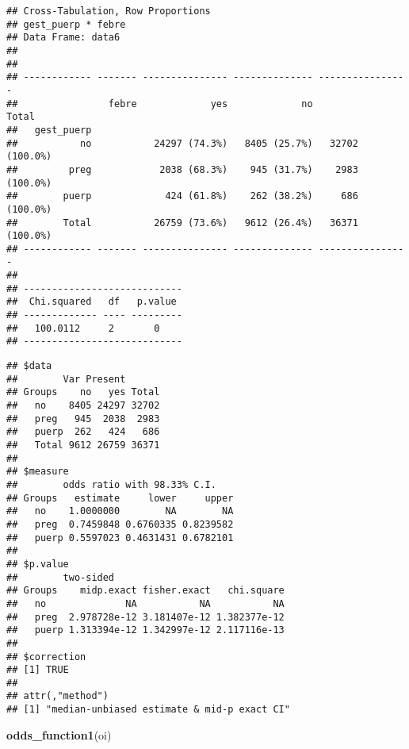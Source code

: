 \documentclass[
]{article}
\newenvironment{Shaded}{\begin{snugshade}}{\end{snugshade}}
\newcommand{\KeywordTok}[1]{\textcolor[rgb]{0.13,0.29,0.53}{\textbf{#1}}}
\newcommand{\NormalTok}[1]{#1}
\newcommand{\OperatorTok}[1]{\textcolor[rgb]{0.81,0.36,0.00}{\textbf{#1}}}
\newcommand{\StringTok}[1]{\textcolor[rgb]{0.31,0.60,0.02}{#1}}
\begin{document}
\begin{verbatim}
## Cross-Tabulation, Row Proportions  
## gest_puerp * febre  
## Data Frame: data6  
## 
## 
## ------------ ------- --------------- -------------- ----------------
##                febre             yes             no            Total
##   gest_puerp                                                        
##           no           24297 (74.3%)   8405 (25.7%)   32702 (100.0%)
##         preg            2038 (68.3%)    945 (31.7%)    2983 (100.0%)
##        puerp             424 (61.8%)    262 (38.2%)     686 (100.0%)
##        Total           26759 (73.6%)   9612 (26.4%)   36371 (100.0%)
## ------------ ------- --------------- -------------- ----------------
## 
## ----------------------------
##  Chi.squared   df   p.value 
## ------------- ---- ---------
##   100.0112     2       0    
## ----------------------------
\end{verbatim}

\begin{Shaded}
\end{Shaded}

\begin{verbatim}
## $data
##        Var Present
## Groups    no   yes Total
##   no    8405 24297 32702
##   preg   945  2038  2983
##   puerp  262   424   686
##   Total 9612 26759 36371
## 
## $measure
##        odds ratio with 98.33% C.I.
## Groups   estimate     lower     upper
##   no    1.0000000        NA        NA
##   preg  0.7459848 0.6760335 0.8239582
##   puerp 0.5597023 0.4631431 0.6782101
## 
## $p.value
##        two-sided
## Groups    midp.exact fisher.exact   chi.square
##   no              NA           NA           NA
##   preg  2.978728e-12 3.181407e-12 1.382377e-12
##   puerp 1.313394e-12 1.342997e-12 2.117116e-13
## 
## $correction
## [1] TRUE
## 
## attr(,"method")
## [1] "median-unbiased estimate & mid-p exact CI"
\end{verbatim}

\begin{Shaded}
\begin{Highlighting}[]
\KeywordTok{odds_function1}\NormalTok{(oi)}
\end{Highlighting}
\end{Shaded}
\end{document}
